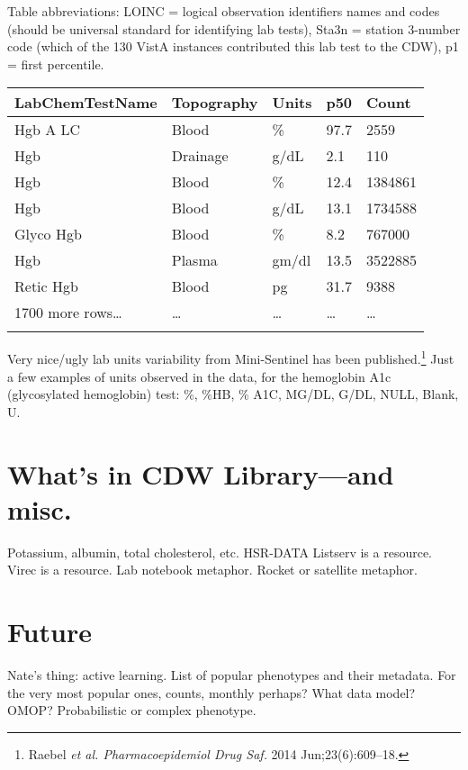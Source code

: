 \documentclass{tufte-handout}
\begin{document}
Table abbreviations: LOINC = logical observation identifiers names and
codes (should be universal standard for identifying lab tests), Sta3n
= station 3-number code (which of the 130 VistA instances contributed
this lab test to the CDW), p1 = first percentile.


\noindent \begin{tabular}{lllll}
\\
\hline
LabChemTestName & Topography & Units & p50 & Count\\
\hline
Hgb A LC & Blood & \% & 97.7 & 2559\\
Hgb & Drainage & g/dL & 2.1 & 110\\
Hgb & Blood & \% & 12.4 & 1384861\\
Hgb & Blood & g/dL & 13.1 & 1734588\\
Glyco Hgb & Blood & \% & 8.2 & 767000\\
Hgb & Plasma & gm/dl & 13.5 & 3522885\\
Retic Hgb & Blood & pg & 31.7 & 9388\\
1700 more rows\ldots{} & \ldots{} & \ldots{} & \ldots{} & \ldots{} \\
\hline
\\
\end{tabular}


Very nice/ugly lab units variability from Mini-Sentinel has been
published.\footnote{Raebel \emph{et al. Pharmacoepidemiol Drug Saf.}
  2014 Jun;23(6):609--18.} Just a few examples of units observed in
the data, for the hemoglobin A1c (glycosylated hemoglobin) test: \%,
\%HB, \% A1C, MG/DL, G/DL, NULL, Blank, U.

\section{What's in CDW Library---and misc.}

Potassium, albumin, total cholesterol, etc. HSR-DATA Listserv is a
resource. Virec is a resource. Lab notebook metaphor. Rocket or
satellite metaphor.

\section{Future}

Nate's thing: active learning. List of popular phenotypes and their
metadata. For the very most popular ones, counts, monthly perhaps?
What data model? OMOP? Probabilistic or complex phenotype.
\end{document}
